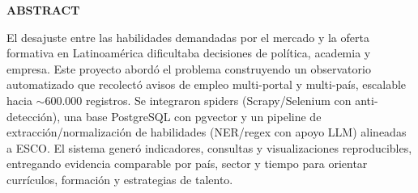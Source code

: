 \thispagestyle{fancy}

\begin{center}
    {\large\bfseries ABSTRACT}
\end{center}

\vspace{1cm}

El desajuste entre las habilidades demandadas por el mercado y la oferta formativa en Latinoamérica dificultaba decisiones de política, academia y empresa. Este proyecto abordó el problema construyendo un observatorio automatizado que recolectó avisos de empleo multi-portal y multi-país, escalable hacia $\sim$600.000 registros. Se integraron spiders (Scrapy/Selenium con anti-detección), una base PostgreSQL con pgvector y un pipeline de extracción/normalización de habilidades (NER/regex con apoyo LLM) alineadas a ESCO. El sistema generó indicadores, consultas y visualizaciones reproducibles, entregando evidencia comparable por país, sector y tiempo para orientar currículos, formación y estrategias de talento.
